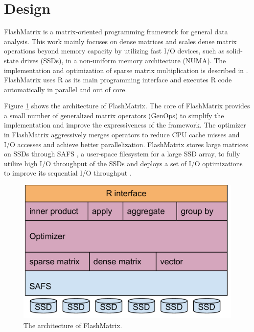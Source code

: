 \section{Design}

FlashMatrix is a matrix-oriented programming framework for general data analysis.
This work mainly focuses on dense matrices and scales dense matrix operations
beyond memory capacity by utilizing fast I/O devices,
such as solid-state drives (SSDs), in a non-uniform memory architecture (NUMA).
The implementation and optimization of sparse matrix multiplication is described
in \cite{SEM_SpMM}.
FlashMatrix uses R as its main programming interface and executes R code
automatically in parallel and out of core.

Figure \ref{fig:arch} shows the architecture of FlashMatrix. The core of
FlashMatrix provides a small number of generalized matrix operators (GenOps)
to simplify the implementation and improve the expressiveness of
the framework. The optimizer in FlashMatrix aggressively merges operators to
reduce CPU cache misses and I/O accesses and achieve better parallelization.
FlashMatrix stores large matrices on SSDs through SAFS \cite{safs},
a user-space filesystem for a large SSD array, to fully utilize high I/O
throughput of the SSDs and deploys a set of I/O optimizations to improve
its sequential I/O throughput \cite{SEM_SpMM}.

\begin{figure}
\centering
\includegraphics[scale=0.3]{FlashMatrix_figs/architecture.pdf}
\caption{The architecture of FlashMatrix.}
\label{fig:arch}
\end{figure}


